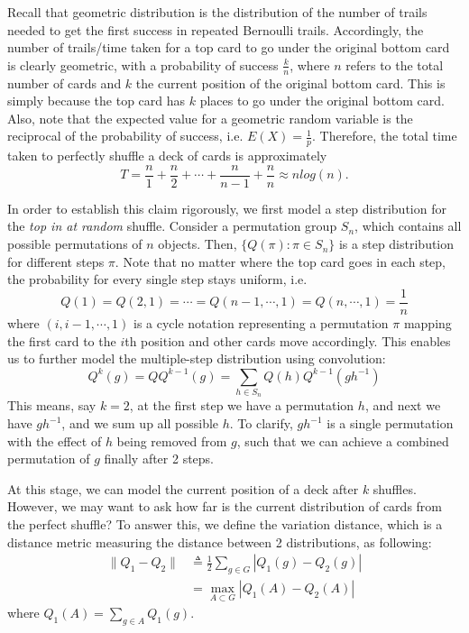 \documentclass[12pt]{article}
\theoremstyle{plain}
\theoremstyle{definition}
\theoremstyle{remark}
\begin{document}
Recall that geometric distribution is the distribution of the number of trails needed to get the first success in repeated Bernoulli trails. Accordingly, the number of trails/time taken for a top card to go under the original bottom card is clearly geometric, with a probability of success $\frac{k}{n}$, where $n$ refers to the total number of cards and $k$ the current position of the original bottom card. This is simply because the top card has $k$ places to go under the original bottom card. Also, note that the expected value for a geometric random variable is the reciprocal of the probability of success, i.e. $E(X)=\frac{1}{p}$. Therefore, the total time taken to perfectly shuffle a deck of cards is approximately $$T = \frac{n}{1} + \frac{n}{2} + \cdots + \frac{n}{n-1} + \frac{n}{n} \approx nlog(n).$$

In order to establish this claim rigorously, we first model a step distribution for the \textit{top in at random} shuffle. Consider a permutation group $S_n$, which contains all possible permutations of $n$ objects. Then, $\{Q(\pi):\pi \in S_n\}$ is a step distribution for different steps $\pi$. Note that no matter where the top card goes in each step, the probability for every single step stays uniform, i.e.  $$Q(1)=Q(2,1)=\cdots=Q(n-1,\cdots,1)=Q(n,\cdots,1)=\frac{1}{n}$$ where $(i,i-1,\cdots,1)$ is a cycle notation representing a permutation $\pi$ mapping the first card to the $i$th position and other cards move accordingly. This enables us to further model the multiple-step distribution using convolution\cite[\pno~334]{1.1}: $$Q^k(g)=QQ^{k-1}(g)=\sum_{h\in S_n}Q(h)Q^{k-1}(gh^{-1})$$
This means, say $k=2$, at the first step we have a permutation $h$, and next we have $gh^{-1}$, and we sum up all possible $h$. To clarify, $gh^{-1}$ is a single permutation with the effect of $h$ being removed from $g$, such that we can achieve a combined permutation of $g$ finally after 2 steps.

At this stage, we can model the current position of a deck after $k$ shuffles. However, we may want to ask how far is the current distribution of cards from the perfect shuffle? To answer this, we define the variation distance, which is a distance metric measuring the distance between 2 distributions, as following\cite[\pno~335]{1.1}:
\begin{equation*}
\begin{split}
    \|Q_1-Q_2\|&\triangleq \frac{1}{2}\sum_{g\in G}|Q_1(g)-Q_2(g)|\\
    &=\max_{A\subset G}|Q_1(A)-Q_2(A)|
\end{split}
\end{equation*}
where $Q_1(A)=\sum_{g\in A}Q_1(g)$.
\end{document}

